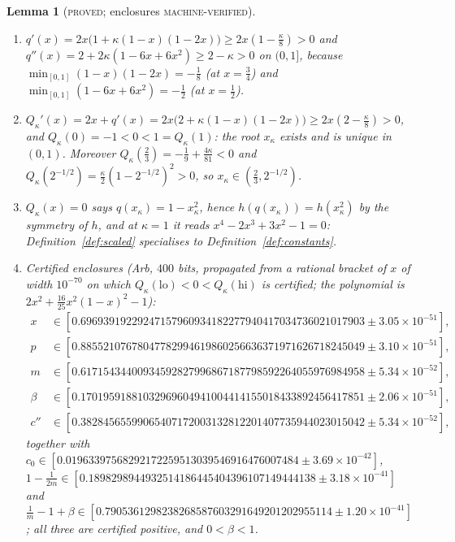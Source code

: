 \documentclass[11pt]{article}
\theoremstyle{plain}
\newtheorem{lemma}[theorem]{Lemma}
\theoremstyle{definition}
\theoremstyle{remark}
\newcommand{\lbl}[1]{\textsc{#1}}
\begin{document}
\begin{lemma}[\lbl{proved}; enclosures \lbl{machine-verified}]\label{lem:scaled-constants}
\leavevmode
\begin{enumerate}[label=(\alph*),nosep]
\item $q'(x)=2x\bigl(1+\kappa(1-x)(1-2x)\bigr)\ge2x(1-\tfrac\kappa8)>0$ and
$q''(x)=2+2\kappa(1-6x+6x^2)\ge2-\kappa>0$ on $(0,1]$, because
$\min_{[0,1]}(1-x)(1-2x)=-\tfrac18$ (at $x=\tfrac34$) and
$\min_{[0,1]}(1-6x+6x^2)=-\tfrac12$ (at $x=\tfrac12$).
\item $Q_\kappa'(x)=2x+q'(x)=2x\bigl(2+\kappa(1-x)(1-2x)\bigr)\ge2x(2-\tfrac\kappa8)>0$,
and $Q_\kappa(0)=-1<0<1=Q_\kappa(1)$: the root $x_\kappa$ exists and is unique in
$(0,1)$.  Moreover $Q_\kappa(\tfrac23)=-\tfrac19+\tfrac{4\kappa}{81}<0$ and
$Q_\kappa(2^{-1/2})=\tfrac\kappa2(1-2^{-1/2})^2>0$, so
$x_\kappa\in(\tfrac23,2^{-1/2})$.
\item $Q_\kappa(x)=0$ says $q(x_\kappa)=1-x_\kappa^2$, hence
$h(q(x_\kappa))=h(x_\kappa^2)$ by the symmetry of $h$, and at $\kappa=1$ it
reads $x^4-2x^3+3x^2-1=0$: Definition~\ref{def:scaled} specialises to
Definition~\ref{def:constants}.
\item Certified enclosures (Arb, $400$ bits, propagated from a rational
bracket of $x$ of width $10^{-70}$ on which
$Q_\kappa(\mathrm{lo})<0<Q_\kappa(\mathrm{hi})$ is certified; the polynomial is
$2x^2+\tfrac{16}{25}x^2(1-x)^2-1$):
\begin{align*}
x&\in[0.69693919229247157960934182277940417034736021017903\pm3.05\times10^{-51}],\\
p&\in[0.88552107678047782994619860256636371971626718245049\pm3.10\times10^{-51}],\\
m&\in[0.61715434400934592827996867187798592264055976984958\pm5.34\times10^{-52}],\\
\beta&\in[0.17019591881032969604941004414155018433892456417851\pm2.06\times10^{-51}],\\
c''&\in[0.38284565599065407172003132812201407735944023015042\pm5.34\times10^{-52}],
\end{align*}
together with $c_0\in[0.01963397568292172259513039546916476007484\pm3.69\times10^{-42}]$,
$1-\tfrac1{2m}\in[0.1898298944932514186445404396107149444138\pm3.18\times10^{-41}]$ and
$\tfrac1m-1+\beta\in[0.7905361298238268587603291649201202955114\pm1.20\times10^{-41}]$;
all three are certified positive, and $0<\beta<1$.
\end{enumerate}
\end{lemma}
\end{document}
